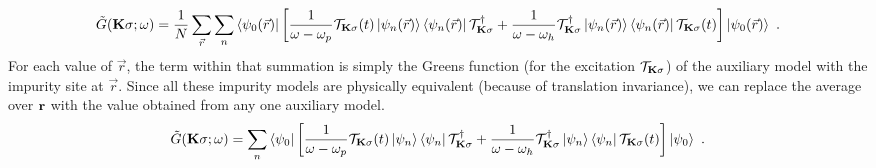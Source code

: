 \documentclass[reprint,hidelinks,onecolumn]{revtex4-2}
\begin{document}
\begin{equation}\begin{aligned}
	\tilde G({\bf K}\sigma; \omega) = \frac{1}{N}\sum_{\vec r}\sum_n \braket{\psi_{0}(\vec r) | \left[\frac{1}{\omega - \omega_p} \mathcal{T}_{{\bf K}\sigma}(t) \ket{\psi_n(\vec r)}\bra{\psi_n(\vec r)} \mathcal{T}_{{\bf K}\sigma}^\dagger + \frac{1}{\omega - \omega_h} \mathcal{T}^\dagger_{{\bf K}\sigma} \ket{\psi_n(\vec r)}\bra{\psi_n(\vec r)} \mathcal{T}_{{\bf K}\sigma}(t)\right] | \psi_{0}(\vec r)} ~.
\end{aligned}\end{equation}
For each value of \({\vec r}\), the term within that summation is simply the Greens function (for the excitation \(\mathcal{T}_{{\bf K}\sigma}\)) of the auxiliary model with the impurity site at \({\vec r}\). Since all these impurity models are physically equivalent (because of translation invariance), we can replace the average over \({\bf r}\) with the value obtained from any one auxiliary model.
\begin{equation}\begin{aligned}
	\tilde G({\bf K}\sigma; \omega) = \sum_n \braket{\psi_{0} | \left[\frac{1}{\omega - \omega_p} \mathcal{T}_{{\bf K}\sigma}(t) \ket{\psi_n}\bra{\psi_n} \mathcal{T}_{{\bf K}\sigma}^\dagger + \frac{1}{\omega - \omega_h} \mathcal{T}^\dagger_{{\bf K}\sigma} \ket{\psi_n}\bra{\psi_n} \mathcal{T}_{{\bf K}\sigma}(t)\right] | \psi_{0}} ~.
\end{aligned}\end{equation}
\end{document}

